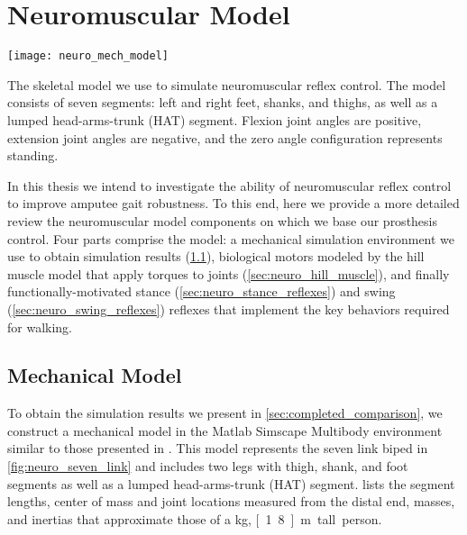 \chapter{Neuromuscular Model}\label{sec:neuro_model}
\begin{marginfigure}
    \centering
    \texttt{[image: neuro\_mech\_model]}
    \caption{The skeletal model we use to simulate neuromuscular reflex control.
    The model consists of seven segments: left and right feet, shanks, and
    thighs, as well as a lumped head-arms-trunk (HAT) segment. Flexion joint
    angles are positive, extension joint angles are negative, and the zero
    angle configuration represents standing.}
    \label{fig:neuro_seven_link}
\end{marginfigure}

In this thesis we intend to investigate the ability of neuromuscular reflex
control to improve amputee gait robustness. To this end, here we provide a more
detailed review the neuromuscular model components on which we base our
prosthesis control. Four parts comprise the model: a mechanical simulation
environment we use to obtain simulation results (\cref{sec:neuro_mech_model}),
biological motors modeled by the hill muscle model that apply torques to joints
(\cref{sec:neuro_hill_muscle}), and finally functionally-motivated stance
(\cref{sec:neuro_stance_reflexes}) and swing (\cref{sec:neuro_swing_reflexes})
reflexes that implement the key behaviors required for walking.

\section{Mechanical Model}\label{sec:neuro_mech_model}

To obtain the simulation results we present in \cref{sec:completed_comparison},
we construct a mechanical model in the Matlab Simscape Multibody environment
similar to those presented in \citet{geyer2010muscle, song2013integration,
song2015neural}.  This model represents the seven link biped in
\cref{fig:neuro_seven_link} and includes two legs with thigh, shank, and foot
segments as well as a lumped head-arms-trunk (HAT) segment.
 lists the segment lengths, center of mass and joint
locations measured from the distal end, masses, and inertias that approximate
those of a \unit[80]{kg}, \unit[1.8]{m} tall person.

